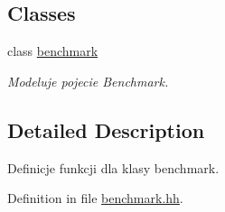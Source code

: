 \subsection*{Classes}
\begin{DoxyCompactItemize}
\item 
class \hyperlink{classbenchmark}{benchmark}
\begin{DoxyCompactList}\small\item\em Modeluje pojecie Benchmark. \end{DoxyCompactList}\end{DoxyCompactItemize}


\subsection{Detailed Description}
Definicje funkcji dla klasy benchmark. 

Definition in file \hyperlink{benchmark_8hh_source}{benchmark.\-hh}.

